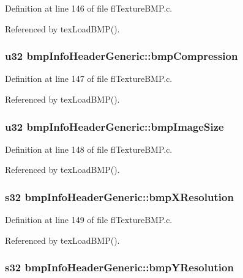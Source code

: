 Definition at line 146 of file fl\-Texture\-BMP.c.

Referenced by tex\-Load\-BMP().
\subsubsection{\setlength{\rightskip}{0pt plus 5cm}u32 {\bf bmp\-Info\-Header\-Generic::bmp\-Compression}}\label{structbmpInfoHeaderGeneric_9a73fb9e0d3744a85efea0eee9be2319}




Definition at line 147 of file fl\-Texture\-BMP.c.

Referenced by tex\-Load\-BMP().
\subsubsection{\setlength{\rightskip}{0pt plus 5cm}u32 {\bf bmp\-Info\-Header\-Generic::bmp\-Image\-Size}}\label{structbmpInfoHeaderGeneric_93a6d0ad9aa96311c4b8827e4e3fd3c2}




Definition at line 148 of file fl\-Texture\-BMP.c.

Referenced by tex\-Load\-BMP().
\subsubsection{\setlength{\rightskip}{0pt plus 5cm}s32 {\bf bmp\-Info\-Header\-Generic::bmp\-XResolution}}\label{structbmpInfoHeaderGeneric_172c17093b05a9231b62d84ba37efbfa}




Definition at line 149 of file fl\-Texture\-BMP.c.

Referenced by tex\-Load\-BMP().
\subsubsection{\setlength{\rightskip}{0pt plus 5cm}s32 {\bf bmp\-Info\-Header\-Generic::bmp\-YResolution}}\label{structbmpInfoHeaderGeneric_80c08696bcfa31646897ec7eca5cd3c5}




